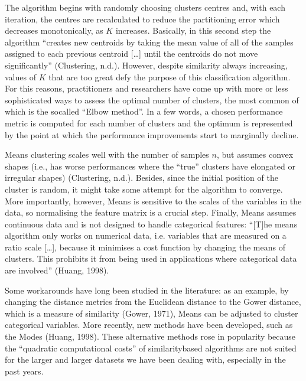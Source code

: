 \documentclass[letterpaper,10pt,english]{jupyterBook}
\begin{document}
\sphinxAtStartPar
The algorithm begins with randomly choosing clusters centres and, with each iteration, the centres are re\sphinxhyphen{}calculated to reduce the partitioning error \sphinxhyphen{} which decreases monotonically, as \(K\) increases. Basically, in this second step the algorithm “creates new centroids by taking the mean value of all of the samples assigned to each previous centroid {[}…{]} until the centroids do not move significantly” (Clustering, n.d.). However, despite similarity always increasing, values of \(K\) that are too great defy the purpose of this classification algorithm. For this reasons, practitioners and researchers have come up with more or less sophisticated ways to assess the optimal number of clusters, the most common of which is the so\sphinxhyphen{}called “Elbow method”. In a few words, a chosen performance metric is computed for each number of clusters and the optimum is represented by the point at which the performance improvements start to marginally decline.

\sphinxAtStartPar
{}\sphinxhyphen{}Means clustering scales well with the number of samples \(n\), but assumes convex shapes (i.e., has worse performances where the “true” clusters have elongated or irregular shapes) (Clustering, n.d.). Besides, since the initial position of the cluster is random, it might take some attempt for the algorithm to converge. More importantly, however, \sphinxhyphen{}Means is sensitive to the scales of the variables in the data, so normalising the feature matrix is a crucial step. Finally, \sphinxhyphen{}Means assumes continuous data and is not designed to handle categorical features: “{[}T{]}he \sphinxhyphen{}means algorithm only works on numerical data, i.e. variables that are measured on a ratio scale {[}…{]}, because it minimises a cost function by changing the means of clusters. This prohibits it from being used in applications where categorical data are involved” (Huang, 1998).

\sphinxAtStartPar
Some workarounds have long been studied in the literature: as an example, by changing the distance metrics from the Euclidean distance to the Gower distance, which is a measure of similarity (Gower, 1971), \sphinxhyphen{}Means can be adjusted to cluster categorical variables. More recently, new methods have been developed, such as the \sphinxhyphen{}Modes (Huang, 1998). These alternative methods rose in popularity because the “quadratic computational costs” of similarity\sphinxhyphen{}based algorithms are not suited for the larger and larger datasets we have been dealing with, especially in the past years.
\end{document}
